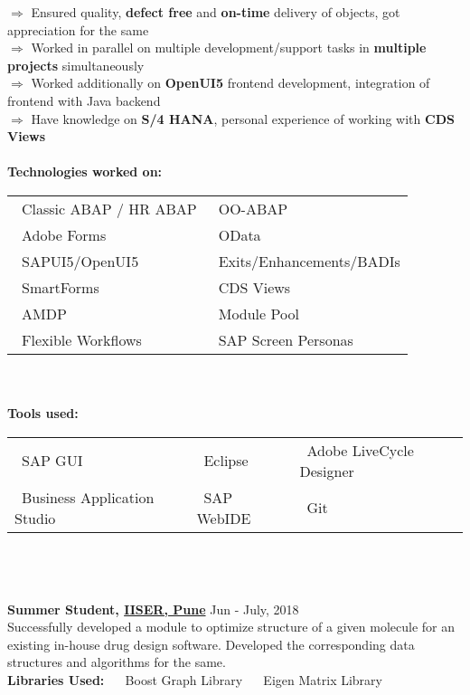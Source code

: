\documentclass[margin, centered, a4paper]{res}
\begin{document}
\begin{resume}
$\Rightarrow$ Ensured quality, \textbf{defect free} and \textbf{on-time} delivery of objects, got appreciation for the same\\
$\Rightarrow$ Worked in parallel on multiple development/support tasks in \textbf{multiple projects} simultaneously\\
$\Rightarrow$ Worked additionally on \textbf{OpenUI5} frontend development, integration of frontend with Java backend\\
$\Rightarrow$ Have knowledge on \textbf{S/4 HANA}, personal experience of working with \textbf{CDS Views}\\
\\
\textbf{Technologies worked on:} \begin{tabular}{ l l }
	\textbullet~Classic ABAP / HR ABAP & \textbullet~OO-ABAP\\
	\textbullet~Adobe Forms & \textbullet~OData\\
	\textbullet~SAPUI5/OpenUI5 & \textbullet~Exits/Enhancements/BADIs\\
	\textbullet~SmartForms & \textbullet~CDS Views\\
	\textbullet~AMDP & \textbullet~Module Pool\\
	\textbullet~Flexible Workflows & \textbullet~SAP Screen Personas\\
\end{tabular}\\
\\
\textbf{Tools used:} \begin{tabular}{ l l l }
	\textbullet~SAP GUI & \textbullet~Eclipse & \textbullet~Adobe LiveCycle Designer\\
	\textbullet~Business Application Studio & \textbullet~SAP WebIDE & \textbullet~Git\\
\end{tabular}\\
\\
\\
\textbf{Summer Student, \href{http://www.iiserpune.ac.in/}{IISER, Pune}} \hfill{Jun - July, 2018}\\
Successfully developed a module to optimize structure of a given molecule for an existing in-house drug design software. Developed the corresponding data structures and algorithms for the same.\\
\textbf{Libraries Used:} ~\textbullet~ Boost Graph Library ~\textbullet~ Eigen Matrix Library\\

\end{resume}
\end{document}
